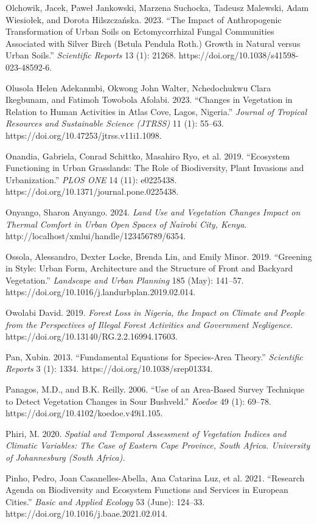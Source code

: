 Olchowik, Jacek, Paweł Jankowski, Marzena Suchocka, Tadeusz Malewski, Adam Wiesiołek, and Dorota Hilszczańska. 2023. ``The Impact of Anthropogenic Transformation of Urban Soils on Ectomycorrhizal Fungal Communities Associated with Silver Birch (Betula Pendula Roth.) Growth in Natural versus Urban Soils.'' \emph{Scientific Reports} 13 (1): 21268. https://doi.org/10.1038/s41598-023-48592-6.

Olusola Helen Adekanmbi, Okwong John Walter, Nchedochukwu Clara Ikegbunam, and Fatimoh Towobola Afolabi. 2023. ``Changes in Vegetation in Relation to Human Activities in Atlas Cove, Lagos, Nigeria.'' \emph{Journal of Tropical Resources and Sustainable Science (JTRSS)} 11 (1): 55--63. https://doi.org/10.47253/jtrss.v11i1.1098.

Onandia, Gabriela, Conrad Schittko, Masahiro Ryo, et al. 2019. ``Ecosystem Functioning in Urban Grasslands: The Role of Biodiversity, Plant Invasions and Urbanization.'' \emph{PLOS ONE} 14 (11): e0225438. https://doi.org/10.1371/journal.pone.0225438.

Onyango, Sharon Anyango. 2024. \emph{Land Use and Vegetation Changes Impact on Thermal Comfort in Urban Open Spaces of Nairobi City, Kenya}. http://localhost/xmlui/handle/123456789/6354.

Ossola, Alessandro, Dexter Locke, Brenda Lin, and Emily Minor. 2019. ``Greening in Style: Urban Form, Architecture and the Structure of Front and Backyard Vegetation.'' \emph{Landscape and Urban Planning} 185 (May): 141--57. https://doi.org/10.1016/j.landurbplan.2019.02.014.

Owolabi David. 2019. \emph{Forest Loss in Nigeria, the Impact on Climate and People from the Perspectives of Illegal Forest Activities and Government Negligence.} https://doi.org/10.13140/RG.2.2.16994.17603.

Pan, Xubin. 2013. ``Fundamental Equations for Species-Area Theory.'' \emph{Scientific Reports} 3 (1): 1334. https://doi.org/10.1038/srep01334.

Panagos, M.D., and B.K. Reilly. 2006. ``Use of an Area-Based Survey Technique to Detect Vegetation Changes in Sour Bushveld.'' \emph{Koedoe} 49 (1): 69--78. https://doi.org/10.4102/koedoe.v49i1.105.

Phiri, M. 2020. \emph{Spatial and Temporal Assessment of Vegetation Indices and Climatic Variables: The Case of Eastern Cape Province, South Africa. University of Johannesburg (South Africa).}

Pinho, Pedro, Joan Casanelles-Abella, Ana Catarina Luz, et al. 2021. ``Research Agenda on Biodiversity and Ecosystem Functions and Services in European Cities.'' \emph{Basic and Applied Ecology} 53 (June): 124--33. https://doi.org/10.1016/j.baae.2021.02.014.

